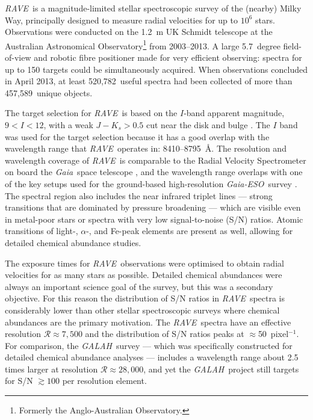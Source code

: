 \documentclass[preprint,trackchanges]{aastex}
\newcommand{\acronym}[1]{{\small{#1}}}
\newcommand{\project}[1]{\textsl{#1}}
\newcommand{\gaia}{\project{Gaia}}
\newcommand{\rave}{\project{\acronym{RAVE}}}
\newcommand{\galah}{\project{\acronym{GALAH}}}
\newcommand{\ges}{\project{Gaia-ESO}}
\newcommand{\Nspectra}{520,782}
\newcommand{\Nstars}{457,589}
\begin{document}
\rave\ is a magnitude-limited stellar spectroscopic survey of the (nearby) Milky Way,
principally designed to measure radial velocities for up to $10^6$ stars.
Observations were conducted on the 1.2~m UK Schmidt telescope at the Australian 
Astronomical Observatory\footnote{Formerly the Anglo-Australian Observatory.} from 
2003--2013.  A large 5.7~degree field-of-view and robotic fibre positioner made for 
very efficient observing:  spectra for up to 150 targets could be simultaneously
acquired.  When observations concluded in April 2013, at least \Nspectra\ useful 
spectra had been collected of more than \Nstars\ unique objects. 


The target selection for \rave\ is based on the $I$-band apparent magnitude,
$9 < I < 12$, with a weak $J - K_s > 0.5$ cut near the disk and bulge \citep{Wojno_2016}.  
The $I$ band was used for the target selection because it has a good overlap with the
wavelength range that \rave\ operates in:  8410--8795~\AA.  The resolution and 
wavelength coverage of \rave\ is comparable to the Radial Velocity Spectrometer on
board the \gaia\ space telescope \citep{Munari_2005,Kordopatis_2011,Recio-Blanco_2016}, 
and the wavelength range overlaps with one of the key setups used for the ground-based 
high-resolution \ges\ survey \citep{Gilmore_2012,Randich_2013}.  The spectral region 
also includes the  near infrared triplet lines --- strong transitions that 
are dominated by pressure broadening --- which are visible even in metal-poor stars
or spectra with very low signal-to-noise (S/N) ratios.  Atomic transitions of 
light-, $\alpha$-, and Fe-peak elements are present as well, allowing for detailed 
chemical abundance studies.


The exposure times for \rave\ observations were optimised to obtain radial 
velocities for as many stars as possible.  Detailed chemical abundances were
always an important science goal of the survey, but this was a secondary objective.  
For this reason the distribution of S/N ratios in \rave\ spectra is considerably 
lower than other stellar spectroscopic surveys where chemical abundances are the 
primary motivation.  The \rave\ spectra have an effective resolution 
$\mathcal{R} \approx 7{,}500$ and the distribution of S/N ratios peaks at 
$\approx$50~pixel$^{-1}$.  For comparison, the \galah\ survey 
\citep{DeSilva_2015} --- which was specifically constructed for detailed chemical 
abundance analyses --- includes a wavelength range about 2.5 times larger at 
resolution $\mathcal{R} \approx 28{,}000$, and yet the \galah\ project still 
targets for S/N $\gtrsim100$ per resolution element.
\end{document}
